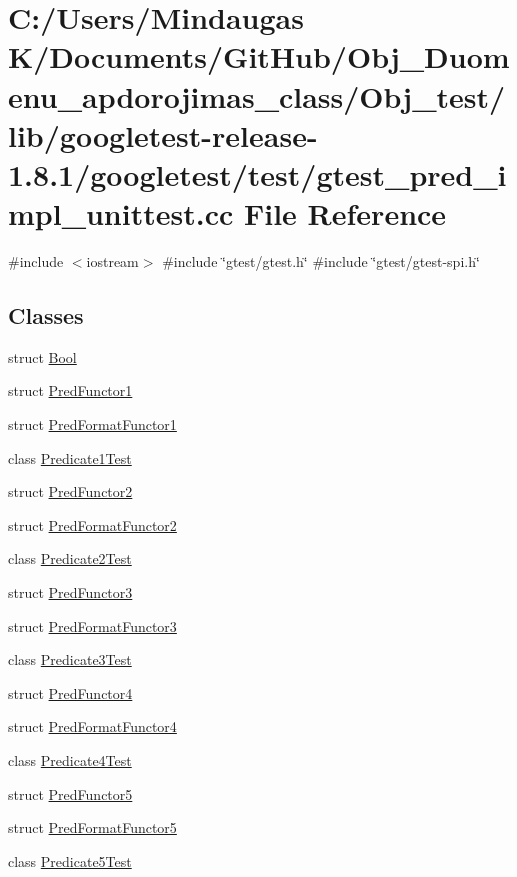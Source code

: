 \hypertarget{_obj__test_2lib_2googletest-release-1_88_81_2googletest_2test_2gtest__pred__impl__unittest_8cc}{}\section{C\+:/\+Users/\+Mindaugas K/\+Documents/\+Git\+Hub/\+Obj\+\_\+\+Duomenu\+\_\+apdorojimas\+\_\+class/\+Obj\+\_\+test/lib/googletest-\/release-\/1.8.1/googletest/test/gtest\+\_\+pred\+\_\+impl\+\_\+unittest.cc File Reference}
\label{_obj__test_2lib_2googletest-release-1_88_81_2googletest_2test_2gtest__pred__impl__unittest_8cc}
{\ttfamily \#include $<$iostream$>$}\newline
{\ttfamily \#include \char`\"{}gtest/gtest.\+h\char`\"{}}\newline
{\ttfamily \#include \char`\"{}gtest/gtest-\/spi.\+h\char`\"{}}\newline
\subsection*{Classes}
\begin{DoxyCompactItemize}
\item 
struct \mbox{\hyperlink{struct_bool}{Bool}}
\item 
struct \mbox{\hyperlink{struct_pred_functor1}{Pred\+Functor1}}
\item 
struct \mbox{\hyperlink{struct_pred_format_functor1}{Pred\+Format\+Functor1}}
\item 
class \mbox{\hyperlink{class_predicate1_test}{Predicate1\+Test}}
\item 
struct \mbox{\hyperlink{struct_pred_functor2}{Pred\+Functor2}}
\item 
struct \mbox{\hyperlink{struct_pred_format_functor2}{Pred\+Format\+Functor2}}
\item 
class \mbox{\hyperlink{class_predicate2_test}{Predicate2\+Test}}
\item 
struct \mbox{\hyperlink{struct_pred_functor3}{Pred\+Functor3}}
\item 
struct \mbox{\hyperlink{struct_pred_format_functor3}{Pred\+Format\+Functor3}}
\item 
class \mbox{\hyperlink{class_predicate3_test}{Predicate3\+Test}}
\item 
struct \mbox{\hyperlink{struct_pred_functor4}{Pred\+Functor4}}
\item 
struct \mbox{\hyperlink{struct_pred_format_functor4}{Pred\+Format\+Functor4}}
\item 
class \mbox{\hyperlink{class_predicate4_test}{Predicate4\+Test}}
\item 
struct \mbox{\hyperlink{struct_pred_functor5}{Pred\+Functor5}}
\item 
struct \mbox{\hyperlink{struct_pred_format_functor5}{Pred\+Format\+Functor5}}
\item 
class \mbox{\hyperlink{class_predicate5_test}{Predicate5\+Test}}
\end{DoxyCompactItemize}
